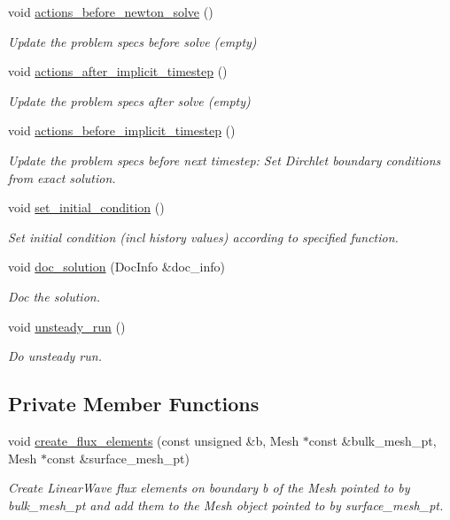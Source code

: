 \begin{DoxyCompactItemize}
void \hyperlink{classLinearWaveProblem_a66e87510f6fa8af693cede514cb7a62e}{actions\+\_\+before\+\_\+newton\+\_\+solve} ()
\begin{DoxyCompactList}\small\item\em Update the problem specs before solve (empty) \end{DoxyCompactList}\item 
void \hyperlink{classLinearWaveProblem_a521290f43f9aac37c9604e744fa71075}{actions\+\_\+after\+\_\+implicit\+\_\+timestep} ()
\begin{DoxyCompactList}\small\item\em Update the problem specs after solve (empty) \end{DoxyCompactList}\item 
void \hyperlink{classLinearWaveProblem_a39cfcb8ce06463ace1ac09fa43afa00a}{actions\+\_\+before\+\_\+implicit\+\_\+timestep} ()
\begin{DoxyCompactList}\small\item\em Update the problem specs before next timestep\+: Set Dirchlet boundary conditions from exact solution. \end{DoxyCompactList}\item 
void \hyperlink{classLinearWaveProblem_afb5d327791d8289a8a0a565afc8aee37}{set\+\_\+initial\+\_\+condition} ()
\begin{DoxyCompactList}\small\item\em Set initial condition (incl history values) according to specified function. \end{DoxyCompactList}\item 
void \hyperlink{classLinearWaveProblem_a6d9396a693be0479ece9ac1f14f9233a}{doc\+\_\+solution} (Doc\+Info \&doc\+\_\+info)
\begin{DoxyCompactList}\small\item\em Doc the solution. \end{DoxyCompactList}\item 
void \hyperlink{classLinearWaveProblem_a9993365201bfffcc04dd2034f0d3d391}{unsteady\+\_\+run} ()
\begin{DoxyCompactList}\small\item\em Do unsteady run. \end{DoxyCompactList}\end{DoxyCompactItemize}
\subsection*{Private Member Functions}
\begin{DoxyCompactItemize}
\item 
void \hyperlink{classLinearWaveProblem_a2ea8935076615413cc864e127345b1c0}{create\+\_\+flux\+\_\+elements} (const unsigned \&b, Mesh $\ast$const \&bulk\+\_\+mesh\+\_\+pt, Mesh $\ast$const \&surface\+\_\+mesh\+\_\+pt)
\begin{DoxyCompactList}\small\item\em Create Linear\+Wave flux elements on boundary b of the Mesh pointed to by bulk\+\_\+mesh\+\_\+pt and add them to the Mesh object pointed to by surface\+\_\+mesh\+\_\+pt. \end{DoxyCompactList}\end{DoxyCompactItemize}
